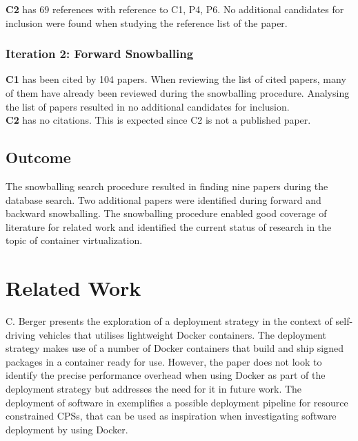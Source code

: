 \textbf{C2} has 69 references with reference to C1, P4, P6. No additional candidates for inclusion were found when studying the reference list of the paper.

\subsubsection*{Iteration 2: Forward Snowballing}
\textbf{C1} has been cited by 104 papers. When reviewing the list of cited papers, many of them have already been reviewed during the snowballing procedure.  Analysing the list of papers resulted in no additional candidates for inclusion.\\ 
 
\textbf{C2} has no citations. This is expected since C2 is not a published paper. 


\subsection{Outcome}
The snowballing search procedure resulted in finding nine papers during the database search. Two additional papers were identified during forward and backward snowballing. The snowballing procedure enabled good coverage of literature for related work and identified the current status of research in the topic of container virtualization. 


\section{Related Work} 


C. Berger \cite{cberger} presents the exploration of a deployment strategy in the context of self-driving vehicles that utilises lightweight Docker containers. The deployment strategy makes use of a number of Docker containers that build and ship signed packages in a container ready for use. However, the paper does not look to identify the precise performance overhead when using Docker as part of the deployment strategy but addresses the need for it in future work. The deployment of software in \cite{cberger} exemplifies a possible deployment pipeline for resource constrained CPSs, that can be used as inspiration when investigating software deployment by using Docker.\\

